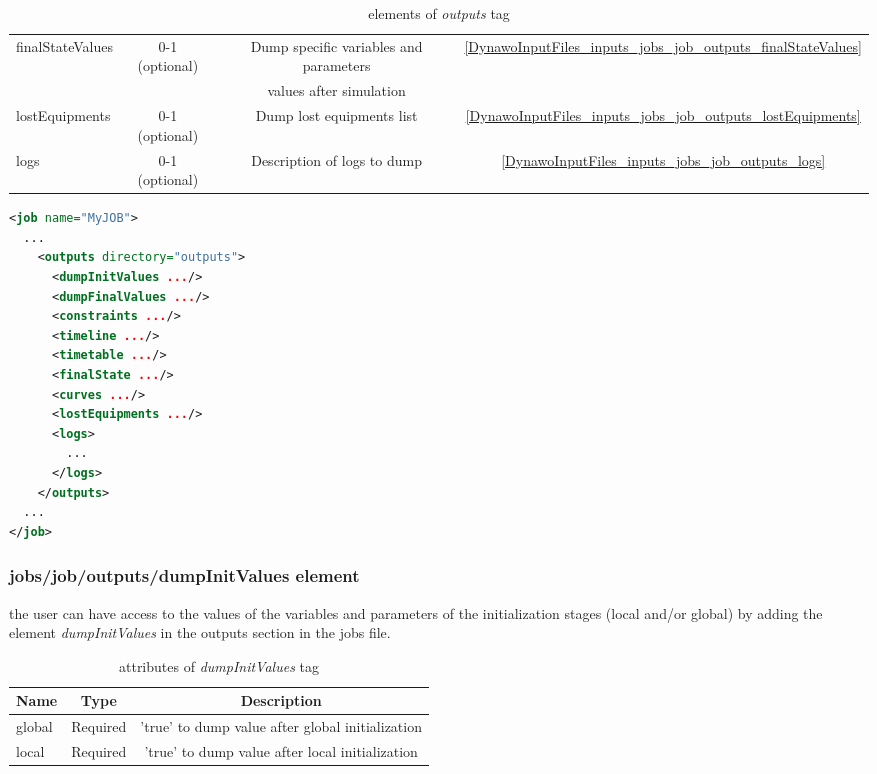 \documentclass[a4paper, 12pt]{report}
\begin{document}
\begin{table}[H]
\begin{tabular}{ l | c | c | c }
\rowcolor{gray!10}
\small{finalStateValues} & \small{0-1 (optional)} & \small{Dump specific variables and parameters}  & \ref{DynawoInputFiles_inputs_jobs_job_outputs_finalStateValues}\\
\rowcolor{gray!10}
 & & \small{values after simulation}  & \\
\rowcolor{white}
\small{lostEquipments} & \small{0-1 (optional)} & \small{Dump lost equipments list}  & \ref{DynawoInputFiles_inputs_jobs_job_outputs_lostEquipments}\\
\rowcolor{gray!10}
\small{logs} & \small{0-1 (optional)} & \small{Description of logs to dump}  & \ref{DynawoInputFiles_inputs_jobs_job_outputs_logs}\\
\bottomrule
\end{tabular}
\caption{elements of \textit{outputs} tag}
\end{table}

\begin{lstlisting}[language=XML, morekeywords={network}]
<job name="MyJOB">
  ...
    <outputs directory="outputs">
      <dumpInitValues .../>
      <dumpFinalValues .../>
      <constraints .../>
      <timeline .../>
      <timetable .../>
      <finalState .../>
      <curves .../>
      <lostEquipments .../>
      <logs>
        ...
      </logs>
    </outputs>
  ...
</job>
\end{lstlisting}

\subsubsection{jobs/job/outputs/dumpInitValues element}
\label{DynawoInputFiles_inputs_jobs_job_outputs_dumpInitValues}

the user can have access to the values of the variables and parameters of the initialization stages (local and/or global) by adding the element \textit{dumpInitValues} in the outputs section in the jobs file.

\begin{table}[H]
\center
\begin{tabular}{ l | c | c }
\toprule
\textbf{{Name}} & \textbf{{Type}} & \textbf{{Description}}\\
\midrule
\rowcolor{white}
\small{global} & \small{Required} & \small{'true' to dump value after global initialization}\\
\rowcolor{gray!10}
\small{local} & \small{Required} & \small{'true' to dump value after local initialization}\\
\bottomrule
\end{tabular}
\caption{attributes of \textit{dumpInitValues} tag}
\end{table}
\end{document}
